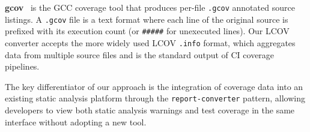 \textbf{gcov}~\cite{gcov} is the GCC coverage tool that produces per-file \texttt{.gcov} annotated source listings. A \texttt{.gcov} file is a text format where each line of the original source is prefixed with its execution count (or \texttt{\#\#\#\#\#} for unexecuted lines). Our LCOV converter accepts the more widely used LCOV \texttt{.info} format, which aggregates data from multiple source files and is the standard output of CI coverage pipelines.

The key differentiator of our approach is the integration of coverage data into an existing static analysis platform through the \texttt{report-converter} pattern, allowing developers to view both static analysis warnings and test coverage in the same interface without adopting a new tool.

